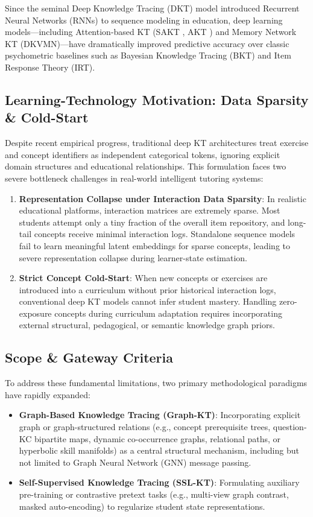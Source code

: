 \documentclass[journal]{IEEEtran}
\begin{document}
Since the seminal Deep Knowledge Tracing (DKT) model \cite{Piech_DKT_2015} introduced Recurrent Neural Networks (RNNs) to sequence modeling in education, deep learning models---including Attention-based KT (SAKT \cite{Pandey_SAKT_2019}, AKT \cite{Ghosh_AKT_2020}) and Memory Network KT (DKVMN)---have dramatically improved predictive accuracy over classic psychometric baselines such as Bayesian Knowledge Tracing (BKT) and Item Response Theory (IRT).

\subsection{Learning-Technology Motivation: Data Sparsity \& Cold-Start}
Despite recent empirical progress, traditional deep KT architectures treat exercise and concept identifiers as independent categorical tokens, ignoring explicit domain structures and educational relationships. This formulation faces two severe bottleneck challenges in real-world intelligent tutoring systems:
\begin{enumerate}
    \item \textbf{Representation Collapse under Interaction Data Sparsity}: In realistic educational platforms, interaction matrices are extremely sparse. Most students attempt only a tiny fraction of the overall item repository, and long-tail concepts receive minimal interaction logs. Standalone sequence models fail to learn meaningful latent embeddings for sparse concepts, leading to severe representation collapse during learner-state estimation.
    \item \textbf{Strict Concept Cold-Start}: When new concepts or exercises are introduced into a curriculum without prior historical interaction logs, conventional deep KT models cannot infer student mastery. Handling zero-exposure concepts during curriculum adaptation requires incorporating external structural, pedagogical, or semantic knowledge graph priors.
\end{enumerate}

\subsection{Scope \& Gateway Criteria}
To address these fundamental limitations, two primary methodological paradigms have rapidly expanded:
\begin{itemize}
    \item \textbf{Graph-Based Knowledge Tracing (Graph-KT)}: Incorporating explicit graph or graph-structured relations (e.g., concept prerequisite trees, question-KC bipartite maps, dynamic co-occurrence graphs, relational paths, or hyperbolic skill manifolds) as a central structural mechanism, including but not limited to Graph Neural Network (GNN) message passing.
    \item \textbf{Self-Supervised Knowledge Tracing (SSL-KT)}: Formulating auxiliary pre-training or contrastive pretext tasks (e.g., multi-view graph contrast, masked auto-encoding) to regularize student state representations.
\end{itemize}
\end{document}
